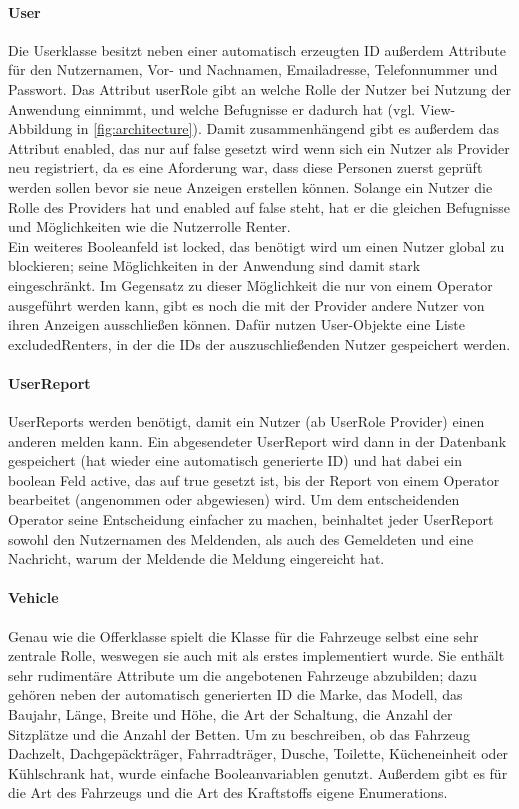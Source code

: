 \paragraph{User}
Die Userklasse besitzt neben einer automatisch erzeugten ID außerdem Attribute für den Nutzernamen, Vor- und Nachnamen, Emailadresse, Telefonnummer und Passwort. Das Attribut userRole gibt an welche Rolle der Nutzer bei Nutzung der Anwendung einnimmt, und welche Befugnisse er dadurch hat (vgl. View-Abbildung in \ref{fig:architecture}). Damit zusammenhängend gibt es außerdem das Attribut enabled, das nur auf false gesetzt wird wenn sich ein Nutzer als Provider neu registriert, da es eine Aforderung war, dass diese Personen zuerst geprüft werden sollen bevor sie neue Anzeigen erstellen können. Solange ein Nutzer die Rolle des Providers hat und enabled auf false steht, hat er die gleichen Befugnisse und Möglichkeiten wie die Nutzerrolle Renter. \\
Ein weiteres Booleanfeld ist locked, das benötigt wird um einen Nutzer global zu blockieren; seine Möglichkeiten in der Anwendung sind damit stark eingeschränkt. Im Gegensatz zu dieser Möglichkeit die nur von einem Operator ausgeführt werden kann, gibt es noch die mit der Provider andere Nutzer von ihren Anzeigen ausschließen können. Dafür nutzen User-Objekte eine Liste excludedRenters, in der die IDs der auszuschließenden Nutzer gespeichert werden.

\paragraph{UserReport}
UserReports werden benötigt, damit ein Nutzer (ab UserRole Provider) einen anderen melden kann. Ein abgesendeter UserReport wird dann in der Datenbank gespeichert (hat wieder eine automatisch generierte ID) und hat dabei ein boolean Feld active, das auf true gesetzt ist, bis der Report von einem Operator bearbeitet (angenommen oder abgewiesen) wird. Um dem entscheidenden Operator seine Entscheidung einfacher zu machen, beinhaltet jeder UserReport sowohl den Nutzernamen des Meldenden, als auch des Gemeldeten und eine Nachricht, warum der Meldende die Meldung eingereicht hat.

\paragraph{Vehicle}
Genau wie die Offerklasse spielt die Klasse für die Fahrzeuge selbst eine sehr zentrale Rolle, weswegen sie auch mit als erstes implementiert wurde. Sie enthält sehr rudimentäre Attribute um die angebotenen Fahrzeuge abzubilden; dazu gehören neben der automatisch generierten ID die Marke, das Modell, das Baujahr, Länge, Breite und Höhe, die Art der Schaltung, die Anzahl der Sitzplätze und die Anzahl der Betten. Um zu beschreiben, ob das Fahrzeug Dachzelt, Dachgepäckträger, Fahrradträger, Dusche, Toilette, Kücheneinheit oder Kühlschrank hat, wurde einfache Booleanvariablen genutzt. Außerdem gibt es für die Art des Fahrzeugs und die Art des Kraftstoffs eigene Enumerations.

